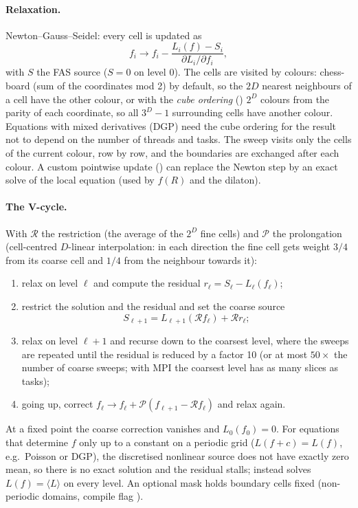\paragraph*{Relaxation.} Newton--Gauss--Seidel: every cell is updated as
\begin{equation}
f_i\to f_i-\frac{L_i(f)-S_i}{\partial L_i/\partial f_i},
\end{equation}
with $S$ the FAS source ($S=0$ on level 0). The cells are visited by colours: chess-board (sum of the coordinates mod 2)
by default, so the $2D$ nearest neighbours of a cell have the other colour, or with the \emph{cube ordering}
() $2^D$ colours from the parity of each coordinate, so all $3^D-1$ surrounding cells have another
colour. Equations with mixed derivatives (DGP) need the cube ordering for the result not to depend on the number of
threads and tasks. The sweep visits only the cells of the current colour, row by row, and the boundaries are exchanged
after each colour. A custom pointwise update () can replace the Newton step by an exact solve of the
local equation (used by $f(R)$ and the dilaton).

\paragraph*{The V-cycle.} With $\mathcal R$ the restriction (the average of the $2^D$ fine cells) and $\mathcal P$ the
prolongation (cell-centred $D$-linear interpolation: in each direction the fine cell gets weight $3/4$ from its coarse cell
and $1/4$ from the neighbour towards it):
\begin{enumerate}
\item relax on level $\ell$ and compute the residual $r_\ell=S_\ell-L_\ell(f_\ell)$;
\item restrict the solution and the residual and set the coarse source
      \begin{equation}
      S_{\ell+1}=L_{\ell+1}(\mathcal Rf_\ell)+\mathcal Rr_\ell ;
      \end{equation}
\item relax on level $\ell+1$ and recurse down to the coarsest level, where the sweeps are repeated until the residual is
      reduced by a factor 10 (or at most $50\times$ the number of coarse sweeps; with MPI the coarsest level has as many
      slices as tasks);
\item going up, correct $f_\ell\to f_\ell+\mathcal P\left(f_{\ell+1}-\mathcal Rf_\ell\right)$ and relax again.
\end{enumerate}
At a fixed point the coarse correction vanishes and $L_0(f_0)=0$. For equations that determine $f$ only up to a constant on a
periodic grid ($L(f+c)=L(f)$, e.g.\ Poisson or DGP), the discretised nonlinear source does not have exactly zero mean, so
there is no exact solution and the residual stalls;  instead solves $L(f)=\langle L\rangle$
on every level. An optional mask holds boundary cells fixed (non-periodic domains, compile flag ).

